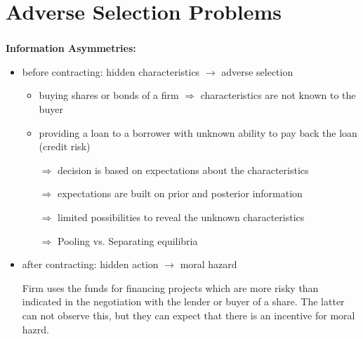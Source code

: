 \documentclass[11pt]{beamer}
\begin{document}
\section{Adverse Selection Problems}
%
\begin{frame}
\frametitle{\insertsection}

\textbf{Information Asymmetries:}
\small
\begin{itemize}
\item before contracting: hidden characteristics $\rightarrow$ adverse selection
\par\medskip
\begin{itemize}
\item buying shares or bonds of a firm $\Rightarrow$ characteristics are not known to the buyer
\item providing a loan to a borrower with unknown ability to pay back the loan (credit risk)
\par\medskip

\item [$\Rightarrow$] decision is based on expectations about the characteristics
\item [$\Rightarrow$] expectations are built on prior and posterior information
\item [$\Rightarrow$] limited possibilities to reveal the unknown characteristics
\item [$\Rightarrow$] Pooling vs. Separating equilibria
\end{itemize}

\item after contracting: hidden action $\rightarrow$ moral hazard
\par\medskip

Firm uses the funds for financing projects which are more risky than indicated in the negotiation with the  lender or buyer of a share. The latter can not observe this, but they can expect that there is an incentive for moral hazrd.
\end{itemize}
\end{frame}

\end{document}
